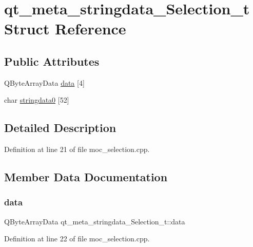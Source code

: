 \hypertarget{structqt__meta__stringdata___selection__t}{}\section{qt\+\_\+meta\+\_\+stringdata\+\_\+\+Selection\+\_\+t Struct Reference}
\label{structqt__meta__stringdata___selection__t}
\subsection*{Public Attributes}
\begin{DoxyCompactItemize}
\item 
Q\+Byte\+Array\+Data \mbox{\hyperlink{structqt__meta__stringdata___selection__t_ac153f153e95caf143389140d4e56cd5b}{data}} \mbox{[}4\mbox{]}
\item 
char \mbox{\hyperlink{structqt__meta__stringdata___selection__t_aebaf48c958bfda11e969b41fc7e0a2eb}{stringdata0}} \mbox{[}52\mbox{]}
\end{DoxyCompactItemize}


\subsection{Detailed Description}


Definition at line 21 of file moc\+\_\+selection.\+cpp.



\subsection{Member Data Documentation}
\mbox{\label{structqt__meta__stringdata___selection__t_ac153f153e95caf143389140d4e56cd5b}} 
\subsubsection{\texorpdfstring{data}{data}}
{\footnotesize\ttfamily Q\+Byte\+Array\+Data qt\+\_\+meta\+\_\+stringdata\+\_\+\+Selection\+\_\+t\+::data}



Definition at line 22 of file moc\+\_\+selection.\+cpp.

